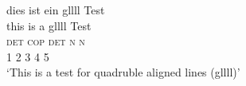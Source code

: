 \ea
 \gllll dies ist ein gllll Test\\
      this is a gllll Test\\
      \textsc{det} \textsc{cop} \textsc{det} \textsc{n} \textsc{n}\\
     1 2 3 4 5\\
 \glt `This is a test for quadruble aligned lines (gllll)'
\z